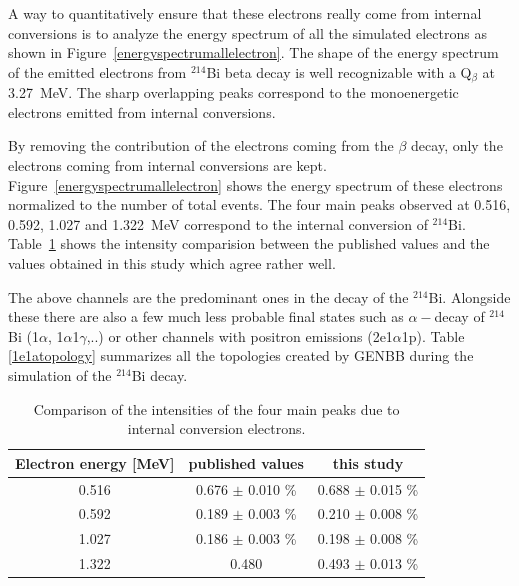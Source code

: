 \documentclass[main.tex]{subfiles}
\begin{document}
\bigskip

 
\noindent A way to quantitatively ensure that these electrons really come from internal conversions is to analyze the energy spectrum of all the simulated electrons as shown in Figure~\ref{energyspectrumallelectron}. The shape of the energy spectrum of the emitted electrons from $^{\text{214}}$Bi beta decay is well recognizable with a Q$_\beta$ at 3.27~MeV. The sharp overlapping peaks correspond to the monoenergetic electrons emitted from internal conversions. 


\bigskip

\noindent By removing the contribution of the electrons coming from the $\beta$ decay, only the electrons coming from internal conversions are kept. Figure~\ref{energyspectrumallelectron} shows the energy spectrum of these electrons normalized to the number of total events. The four main peaks observed at 0.516, 0.592, 1.027 and 1.322~MeV correspond to the internal conversion of $^{\text{214}}$Bi. Table~\ref{internalconversioncomparaison} shows the intensity comparision between the published values \cite{NuclearDataSheet210} and the values obtained in this study which agree rather well.


\bigskip


\noindent The above channels are the predominant ones in the decay of the $^{\text{214}}$Bi. Alongside these there are also a few much less probable final states such as $\alpha-$decay of $^{\text{214}}$Bi (1$\alpha$, 1$\alpha$1$\gamma$,..) or other channels with positron emissions (2e1$\alpha$1p). Table \ref{1e1atopology} summarizes all the topologies created by GENBB during the simulation of the $^{\text{214}}$Bi decay.


\begin{table}[h!]
\begin{center}
\begin{tabular}{c|c|c}
Electron energy [MeV]  & published values & this study \\[0.1cm]
\toprule
0.516  & 0.676 $\pm$ 0.010 \% & 0.688 $\pm$ 0.015 \% \\[0.1cm]
0.592  & 0.189 $\pm$ 0.003 \% & 0.210 $\pm$ 0.008 \% \\[0.1cm]
1.027  & 0.186 $\pm$ 0.003 \% & 0.198 $\pm$ 0.008 \% \\[0.1cm]            
1.322  & 0.480  & 0.493 $\pm$ 0.013 \% \\[0.1cm]
\bottomrule
\end{tabular}
\end{center}
\caption{Comparison of the intensities of the four main peaks due to internal conversion electrons.}
\label{internalconversioncomparaison}
\end{table}
\end{document}

